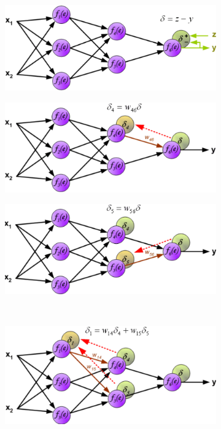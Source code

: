 \documentclass[a4paper,10pt]{article}
\begin{document}
\begin{figure}[h!]
  \centering
  \begin{subfigure}[b]{0.3\linewidth}
   \includegraphics[width=\linewidth]{BackPropa.png}
  \end{subfigure}
  \begin{subfigure}[b]{0.3\linewidth}
   \includegraphics[width=\linewidth]{BackPropb.png}
  \end{subfigure}
  \begin{subfigure}[b]{0.3\linewidth}
   \includegraphics[width=\linewidth]{BackPropc.png}
  \end{subfigure}
  \\
  \begin{subfigure}[b]{0.3\linewidth}
   \includegraphics[width=\linewidth]{BackPropd.png}

\end{subfigure}
\end{figure}
\end{document}
